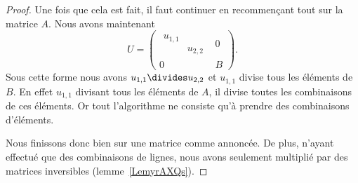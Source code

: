 \begin{proof}
	Une fois que cela est fait, il faut continuer en recommençant tout sur la matrice \( A\). Nous avons maintenant
	\begin{equation}
		U=\begin{pmatrix}
			\begin{matrix}
				u_{1,1} &               \\
				        & u_{2,2}
			\end{matrix}      & 0       \\
			0                 & B
		\end{pmatrix}.
	\end{equation}
	Sous cette forme nous avons \( u_{1,1}\divides u_{2,2}\) et \( u_{1,1}\) divise tous les éléments de \( B\). En effet \( u_{1,1}\) divisant tous les éléments de \( A\), il divise toutes les combinaisons de ces éléments. Or tout l'algorithme ne consiste qu'à prendre des combinaisons d'éléments.

	Nous finissons donc bien sur une matrice comme annoncée. De plus, n'ayant effectué que des combinaisons de lignes, nous avons seulement multiplié par des matrices inversibles (lemme~\ref{LemyrAXQs}).
\end{proof}
